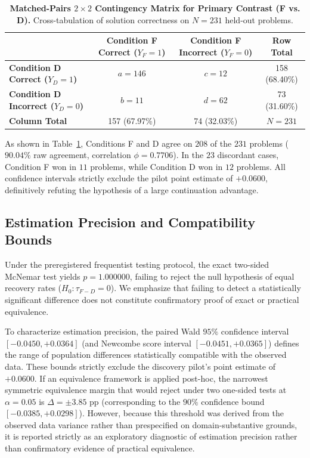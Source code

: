 \documentclass[11pt]{article}
\begin{document}
\begin{table}[t]
\centering
\caption{\textbf{Matched-Pairs $2 \times 2$ Contingency Matrix for Primary Contrast (F vs. D).} Cross-tabulation of solution correctness on $N=231$ held-out problems.}
\label{tab:contingency_matrix}
\begin{tabular}{lccc}
\toprule
& \textbf{Condition F Correct ($Y_F = 1$)} & \textbf{Condition F Incorrect ($Y_F = 0$)} & \textbf{Row Total} \\
\midrule
\textbf{Condition D Correct ($Y_D = 1$)} & $a = 146$ & $c = 12$ & 158 (68.40\%) \\
\textbf{Condition D Incorrect ($Y_D = 0$)} & $b = 11$ & $d = 62$ & 73 (31.60\%) \\
\midrule
\textbf{Column Total} & 157 (67.97\%) & 74 (32.03\%) & \textbf{$N = 231$} \\
\bottomrule
\end{tabular}
\end{table}

As shown in Table~\ref{tab:contingency_matrix}, Conditions F and D agree on $208$ of the $231$ problems ($90.04\%$ raw agreement, correlation $\phi = 0.7706$). In the $23$ discordant cases, Condition F won in $11$ problems, while Condition D won in $12$ problems. All confidence intervals strictly exclude the pilot point estimate of $+0.0600$, definitively refuting the hypothesis of a large continuation advantage.

\subsection{Estimation Precision and Compatibility Bounds}
Under the preregistered frequentist testing protocol, the exact two-sided McNemar test yields $p = 1.000000$, failing to reject the null hypothesis of equal recovery rates ($H_0: \tau_{F-D} = 0$). We emphasize that failing to detect a statistically significant difference does not constitute confirmatory proof of exact or practical equivalence.

To characterize estimation precision, the paired Wald $95\%$ confidence interval $[-0.0450, +0.0364]$ (and Newcombe score interval $[-0.0451, +0.0365]$) defines the range of population differences statistically compatible with the observed data. These bounds strictly exclude the discovery pilot's point estimate of $+0.0600$. If an equivalence framework is applied post-hoc, the narrowest symmetric equivalence margin that would reject under two one-sided tests at $\alpha=0.05$ is $\Delta = \pm 3.85\text{ pp}$ (corresponding to the $90\%$ confidence bound $[-0.0385, +0.0298]$). However, because this threshold was derived from the observed data variance rather than prespecified on domain-substantive grounds, it is reported strictly as an exploratory diagnostic of estimation precision rather than confirmatory evidence of practical equivalence.
\end{document}
